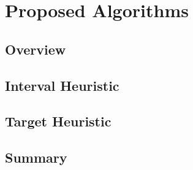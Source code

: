 \chapter{Proposed Algorithms}\label{proposedalgo}
\section{Overview}\label{proposedoverview}
\section{Interval Heuristic}\label{intervalh}
\section{Target Heuristic}\label{targeth}
\section{Summary}

